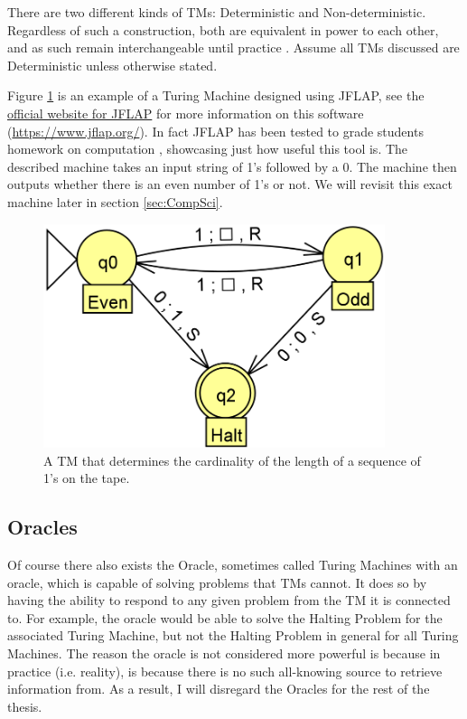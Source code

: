There are two different kinds of TMs: Deterministic and Non-deterministic.
Regardless of such a construction, both are equivalent in power to each other, and as such remain interchangeable until practice \cite{NDTMeqDTM}.
Assume all TMs discussed are Deterministic unless otherwise stated.

Figure \ref{fig:TM} is an example of a Turing Machine designed using JFLAP, see the \href{https://www.jflap.org/}{official website for JFLAP} for more information on this software (\href{https://www.jflap.org/}{https://www.jflap.org/}).
In fact JFLAP has been tested to grade students homework on computation \cite{JFLAPGrading}, showcasing just how useful this tool is.
The described machine takes an input string of 1's followed by a 0.
The machine then outputs whether there is an even number of 1's or not.
We will revisit this exact machine later in section \ref{sec:CompSci}.

\begin{figure}[htb]
    \centering
    \includegraphics[width=10cm]{Images/SampleTMCrop.png}
       \caption{A TM that determines the cardinality of the length of a sequence of 1's on the tape.}
           \label{fig:TM}
\end{figure}

\subsection{Oracles}\label{subsec:Oracles}

Of course there also exists the Oracle, sometimes called Turing Machines with an oracle, which is capable of solving problems that TMs cannot.
It does so by having the ability to respond to any given problem from the TM it is connected to.
For example, the oracle would be able to solve the Halting Problem for the associated Turing Machine, but not the Halting Problem in general for all Turing Machines.
The reason the oracle is not considered more powerful is because in practice (i.e. reality), is because there is no such all-knowing source to retrieve information from.
As a result, I will disregard the Oracles for the rest of the thesis.

